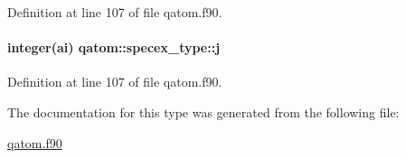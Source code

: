 Definition at line 107 of file qatom.\-f90.

\hypertarget{structqatom_1_1specex__type_ae9ac255a69b9bcee28401ad76c13652f}{
\paragraph[{j}]{\setlength{\rightskip}{0pt plus 5cm}integer(ai) qatom\-::specex\-\_\-type\-::j}}\label{structqatom_1_1specex__type_ae9ac255a69b9bcee28401ad76c13652f}


Definition at line 107 of file qatom.\-f90.



The documentation for this type was generated from the following file\-:\begin{DoxyCompactItemize}
\item 
\hyperlink{qatom_8f90}{qatom.\-f90}\end{DoxyCompactItemize}
